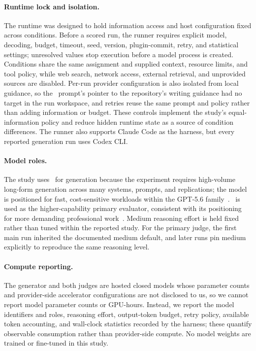 \paragraph{Runtime lock and isolation.}
The runtime was designed to hold information access and host configuration fixed across conditions. Before a scored run, the runner requires explicit model, decoding, budget, timeout, seed, version, plugin-commit, retry, and statistical settings; unresolved values stop execution before a model process is created. Conditions share the same assignment and supplied context, resource limits, and tool policy, while web search, network access, external retrieval, and unprovided sources are disabled. Per-run provider configuration is also isolated from local guidance, so the \condSingleWriter\ prompt's pointer to the repository's writing guidance had no target in the run workspace, and retries reuse the same prompt and policy rather than adding information or budget. These controls implement the study's equal-information policy and reduce hidden runtime state as a source of condition differences.
The runner also supports Claude Code as the harness, but every reported generation run uses Codex CLI.

\paragraph{Model roles.}
The study uses \modelGenBare\ for generation because the experiment requires high-volume long-form generation across many systems, prompts, and replications; the model is positioned for fast, cost-sensitive workloads within the GPT-5.6 family~\citep{openai2026gpt56,openai2026luna}. \modelJudgeBare\ is used as the higher-capability primary evaluator, consistent with its positioning for more demanding professional work~\citep{openai2026gpt56,openai2026sol}. Medium reasoning effort is held fixed rather than tuned within the reported study. For the primary judge, the first main run inherited the documented medium default, and later runs pin medium explicitly to reproduce the same reasoning level.

\paragraph{Compute reporting.}
The generator and both judges are hosted closed models whose parameter counts and provider-side accelerator configurations are not disclosed to us, so we cannot report model parameter counts or GPU-hours.
Instead, we report the model identifiers and roles, reasoning effort, output-token budget, retry policy, available token accounting, and wall-clock statistics recorded by the harness; these quantify observable consumption rather than provider-side compute.
No model weights are trained or fine-tuned in this study.

